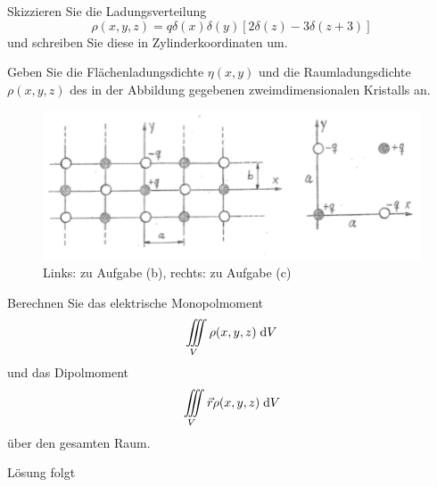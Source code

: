 \documentclass{atistandalonetask}
\begin{document}
  \begin{atiTask}[
    title = Ionenkristalle
  ]
    \begin{atiSubtasks}
    	\item Skizzieren Sie die Ladungsverteilung 
    	\[
    	\rho(x,y,z)=q\delta(x)\delta(y)[2\delta(z)-3\delta(z+3)]
    	\]
    	und schreiben Sie diese in Zylinderkoordinaten um. 
    	\item Geben Sie die Flächenladungsdichte $\eta(x,y)$ und die Raumladungsdichte $\rho(x,y,z)$ des in der Abbildung gegebenen zweimdimensionalen Kristalls an.
    	\begin{figure}[H]
		\centering
		\includegraphics[width=0.7\linewidth]{./picture-delta_v}
		\caption{Links: zu Aufgabe (b), rechts: zu Aufgabe (c)}
		\end{figure}
    	\item Berechnen Sie das elektrische Monopolmoment
    	\[
    	\iiint\limits_V\rho(x,y,z)\;\mathrm{d} V
    	\]
    	und das Dipolmoment
    	\[
    	\iiint\limits_V\vec{r}\rho(x,y,z)\;\mathrm{d} V
    	\]
    	über den gesamten Raum.
    \end{atiSubtasks}	
  \end{atiTask}
  \begin{atiSolution}
   	Lösung folgt
  \end{atiSolution}
\end{document}
